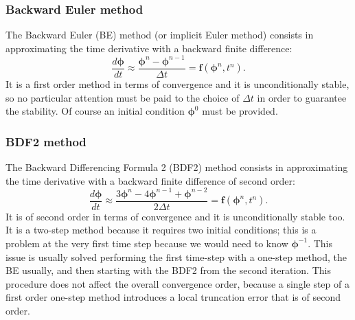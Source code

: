 \subsubsection{Backward Euler method}
The Backward Euler (BE) method (or implicit Euler method) consists in 
approximating the time derivative with a backward finite difference:
\begin{equation} \label{eq:be}
\frac{d \boldsymbol{\phi}}{d t} \approx \frac{\boldsymbol{\phi}^n-\boldsymbol{\phi}^{n-1}}{\Delta 
	t} = \mathbf{f}(\boldsymbol{\phi}^n, t^n).
\end{equation}
It is a first order method in terms of convergence and it is 
unconditionally stable, so no particular attention must be paid to the choice 
of $\Delta t$ in order to guarantee the stability. Of course an initial 
condition $\boldsymbol{\phi}^0$ must be provided.
%
\subsubsection{BDF2 method}
The Backward Differencing Formula 2 (BDF2) method consists in approximating the 
time derivative with a backward finite difference of second order:
\begin{equation} \label{eq:bdf2}
\frac{d \boldsymbol{\phi}}{d t} \approx 
\frac{3\boldsymbol{\phi}^n-4\boldsymbol{\phi}^{n-1}+\boldsymbol{\phi}^{n-2}}{2\Delta t} = \mathbf{f}(\boldsymbol{\phi}^n, t^n).
\end{equation}
It is of second order in terms of convergence and it is 
unconditionally stable too. It is a two-step method because it requires two 
initial conditions; this is a problem at the very first time step because we 
would need to know $\boldsymbol{\phi}^{-1}$. This issue is usually solved performing the first time-step with a one-step method, the BE usually, and then starting with the 
BDF2 from the second iteration. This procedure does not affect the overall 
convergence order, because a single step of a first order one-step method 
introduces a local truncation error that is of second order.

